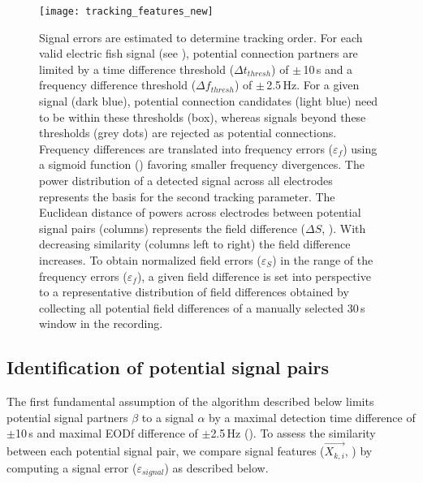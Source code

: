 \begin{figure}[h!]
  \centerline{\texttt{[image: tracking\_features\_new]}}
  \caption{\label{features} Signal errors are estimated to determine tracking order.  For each valid electric fish signal (see ), potential connection partners are limited by a time difference threshold ($\Delta t_{thresh}$) of $\pm$\,10\,s and a frequency difference threshold ($\Delta f_{thresh}$) of $\pm$\,2.5\,Hz. For a given signal (dark blue), potential connection candidates (light blue) need to be within these thresholds (box), whereas signals beyond these thresholds (grey dots) are rejected as potential connections.  Frequency differences are translated into frequency errors ($\varepsilon_{f}$) using a sigmoid function () favoring smaller frequency divergences.  The power distribution of a detected signal across all electrodes represents the basis for the second tracking parameter. The Euclidean distance of powers across electrodes between potential signal pairs (columns) represents the field difference ($\Delta S$, ). With decreasing similarity (columns left to right) the field difference increases.  To obtain normalized field errors ($\varepsilon_{S}$) in the range of the frequency errors ($\varepsilon_{f}$), a given field difference is set into perspective to a representative distribution of field differences obtained by collecting all potential field differences of a manually selected 30\,s window in the recording.}
\end{figure}

\subsection{Identification of potential signal pairs}

The first fundamental assumption of the algorithm described below limits potential signal partners $\beta$ to a signal $\alpha$ by a maximal detection time difference of $\pm$10\,s and maximal EODf difference of $\pm$2.5\,Hz (). To assess the similarity between each potential signal pair, we compare signal features ($\vec{X_{k, i}}$, ) by computing a signal error ($\varepsilon_{signal}$) as described below.

